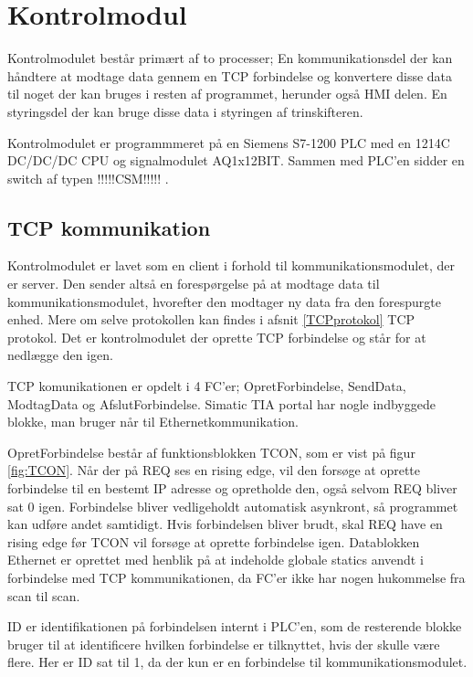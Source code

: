 
\section{Kontrolmodul}
Kontrolmodulet består primært af to processer; En kommunikationsdel der kan håndtere at modtage data gennem en TCP forbindelse og konvertere disse data til noget der kan bruges i resten af programmet, herunder også HMI delen. En styringsdel der kan bruge disse data i styringen af trinskifteren.

Kontrolmodulet er programmmeret på en Siemens S7-1200 PLC med en 1214C DC/DC/DC CPU og signalmodulet AQ1x12BIT. Sammen med PLC'en sidder en switch af typen !!!!!CSM!!!!! .


\subsection{TCP kommunikation}
Kontrolmodulet er lavet som en client i forhold til kommunikationsmodulet, der er server. Den sender altså en forespørgelse på at modtage data til kommunikationsmodulet, hvorefter den modtager ny data fra den forespurgte enhed. Mere om selve protokollen kan findes i afsnit \ref{TCPprotokol} TCP protokol. Det er kontrolmodulet der oprette TCP forbindelse og står for at nedlægge den igen.

TCP komunikationen er opdelt i 4 FC'er; OpretForbindelse, SendData, ModtagData og AfslutForbindelse. Simatic TIA portal har nogle indbyggede blokke, man bruger når til Ethernetkommunikation.

OpretForbindelse består af funktionsblokken TCON, som er vist på figur \ref{fig:TCON}. Når der på REQ ses en rising edge, vil den forsøge at oprette forbindelse til en bestemt IP adresse og opretholde den, også selvom REQ bliver sat 0 igen. Forbindelse bliver vedligeholdt automatisk asynkront, så programmet kan udføre andet samtidigt. Hvis forbindelsen bliver brudt, skal REQ have en rising edge før TCON vil forsøge at oprette forbindelse igen. Datablokken Ethernet er oprettet med henblik på at indeholde globale statics anvendt i forbindelse med TCP kommunikationen, da FC'er ikke har nogen hukommelse fra scan til scan.

ID er identifikationen på forbindelsen internt i PLC'en, som de resterende blokke bruger til at identificere hvilken forbindelse er tilknyttet, hvis der skulle være flere. Her er ID sat til 1, da der kun er en forbindelse til kommunikationsmodulet.

